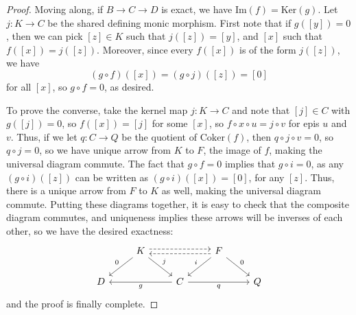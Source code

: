 \documentclass[aps,pra,showpacs,notitlepage,onecolumn,superscriptaddress,nofootinbib]{revtex4-1}
\theoremstyle{definition}
\begin{document}
\begin{proof}
  Moving along, if $B \to C \to D$ is exact, we have $\text{Im}(f) = \text{Ker}(g)$. Let $j : K \rightarrow C$ be the shared defining monic morphism. First note that if $g([y]) = 0$, then
  we can pick $[z] \in K$ such that $j([z]) = [y]$, and $[x]$ such that $f([x]) = j([z])$. Moreover, since every $f([x])$ is of the form $j([z])$, we have
  \begin{equation}
    (g \circ f)([x]) = (g \circ j)([z]) = [0]
    \end{equation}
  for all $[x]$, so $g \circ f = 0$, as desired.

  To prove the converse, take the kernel map $j : K \rightarrow C$ and note that $[j] \in C$ with $g([j]) = 0$, so $f([x]) = [j]$
  for some $[x]$, so $f \circ x \circ u = j \circ v$ for epis $u$ and $v$. Thus, if we let $q : C \rightarrow Q$ be the quotient of $\text{Coker}(f)$, then $q \circ j \circ v = 0$,
  so $q \circ j = 0$, so we have unique arrow from $K$ to $F$, the image of $f$, making the universal diagram commute. The fact that $g \circ f = 0$ implies that $g \circ i = 0$, as any $(g \circ i)([z])$
  can be written as $(g \circ i)([x]) = [0]$, for any $[z]$. Thus, there is a unique arrow from $F$ to $K$ as well,
  making the universal diagram commute. Putting these diagrams together, it is easy to check that the composite diagram commutes, and uniqueness implies these arrows will be inverses of each other, so we have
  the desired exactness:
  \[\begin{tikzcd}
	& K && F \\
	D && C && Q
	\arrow[shift left, dashed, from=1-2, to=1-4]
	\arrow["0"', from=1-2, to=2-1]
	\arrow["j", from=1-2, to=2-3]
	\arrow[shift left, dashed, from=1-4, to=1-2]
	\arrow["i"', from=1-4, to=2-3]
	\arrow["0", from=1-4, to=2-5]
	\arrow["g", from=2-3, to=2-1]
	\arrow["q"', from=2-3, to=2-5]
  \end{tikzcd}\]
  and the proof is finally complete.
  \end{proof}
\end{document}
